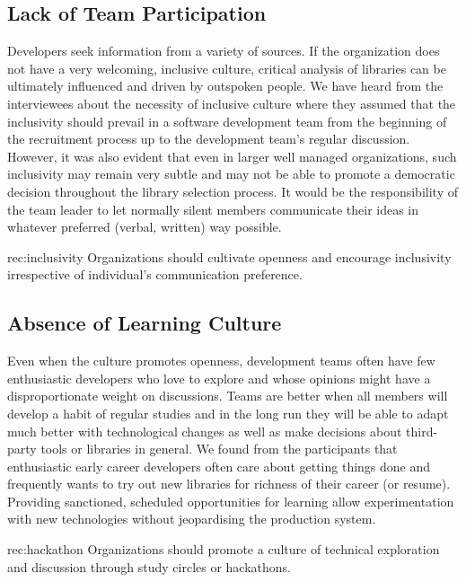 \subsection{Lack of Team Participation}
Developers seek information from a variety of sources. If the organization does not have a very welcoming, inclusive culture, critical analysis of libraries can be ultimately influenced and driven by outspoken people. We have heard from the interviewees about the necessity of inclusive culture where they assumed that the inclusivity should prevail in a software development team from the beginning of the recruitment process up to the development team's regular discussion. However, it was also evident that even in larger well managed organizations, such inclusivity may remain very subtle and may not be able to promote a democratic decision throughout the library selection process. It would be the responsibility of the team leader to let normally silent members communicate their ideas in whatever preferred (verbal, written) way possible.
 \begin{recommendation}{rec:inclusivity}
Organizations should cultivate openness and encourage inclusivity irrespective of individual's communication preference. 
\end{recommendation}\medskip

\subsection{Absence of Learning Culture}
 Even when the culture promotes openness, development teams often have few enthusiastic developers who love to explore and whose opinions might have a disproportionate weight on discussions. Teams are better when all members will develop a habit of regular studies and in the long run they will be able to adapt much better with technological changes as well as make decisions about third-party tools or libraries in general. We found from the participants that enthusiastic early career developers often care about getting things done and frequently wants to try out new libraries for richness of their career (or resume). %
 Providing sanctioned, scheduled opportunities for learning allow experimentation with new technologies without jeopardising the production system.
  \begin{recommendation}{rec:hackathon}
  Organizations should promote a culture of technical exploration and discussion through study circles or hackathons.
\end{recommendation}

